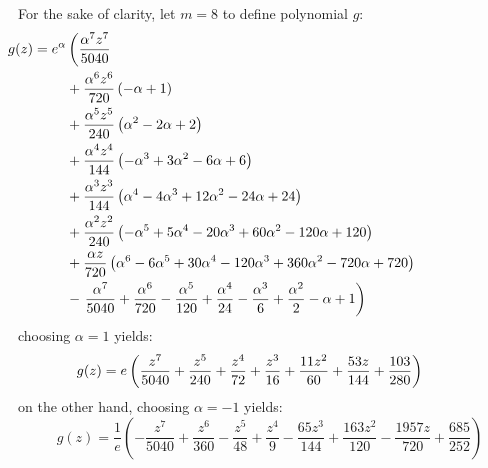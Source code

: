 For the sake of clarity, let $m=8$ to define polynomial $g$:
\begin{displaymath}
\hspace{-3cm}
\begin{split}
g{\left (z \right )} = e^{\alpha}&\left(\frac{\alpha^{7} z^{7}}{5040}\right. \\
&+ \frac{\alpha^{6} z^{6}}{720} \left(- \alpha + 1\right) \\
&+ \frac{\alpha^{5} z^{5}}{240} \left(\alpha^{2} - 2 \alpha + 2\right) \\
&+ \frac{\alpha^{4} z^{4}}{144} \left(- \alpha^{3} + 3 \alpha^{2} - 6 \alpha + 6\right) \\
&+ \frac{\alpha^{3} z^{3}}{144} \left(\alpha^{4} - 4 \alpha^{3} + 12 \alpha^{2} - 24 \alpha + 24\right) \\
&+ \frac{\alpha^{2} z^{2}}{240} \left(- \alpha^{5} + 5 \alpha^{4} - 20 \alpha^{3} + 60 \alpha^{2} - 120 \alpha + 120\right) \\
&+ \frac{\alpha z}{720} \left(\alpha^{6} - 6 \alpha^{5} + 30 \alpha^{4} - 120 \alpha^{3} + 360 \alpha^{2} - 720 \alpha + 720\right) \\
&- \left.\frac{\alpha^{7}}{5040} + \frac{\alpha^{6}}{720} - \frac{\alpha^{5}}{120} + \frac{\alpha^{4}}{24} - \frac{\alpha^{3}}{6} + \frac{\alpha^{2}}{2} -\alpha + 1\right) 
\end{split}
\end{displaymath}
choosing $\alpha=1$ yields:
\begin{displaymath}
\hspace{-1cm}
g{\left (z \right )} = e \left(\frac{z^{7}}{5040} + \frac{z^{5}}{240} + \frac{z^{4}}{72} + \frac{z^{3}}{16} + \frac{11 z^{2}}{60} + \frac{53 z}{144} + \frac{103}{280}\right)
\end{displaymath}
on the other hand, choosing $\alpha=-1$ yields:
\begin{displaymath}
g{\left (z \right )} = \frac{1}{e} \left( - \frac{z^{7}}{5040} + \frac{z^{6}}{360} - \frac{z^{5}}{48} + \frac{z^{4}}{9}\right. - \left.\frac{65 z^{3}}{144} + \frac{163 z^{2}}{120} - \frac{1957 z}{720} + \frac{685}{252}\right)
\end{displaymath}

